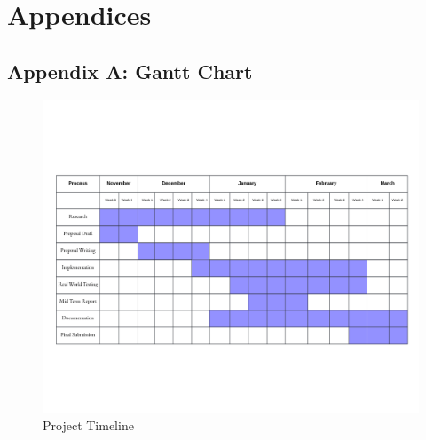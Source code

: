 \chapter{Appendices}


\section*{Appendix A: Gantt Chart}\vspace{-6em}
\begin{figure}[h!]
    \setlength{\abovecaptionskip}{-4em} 
    \includegraphics[width=\textwidth]{content/images/ganttChart.png}
    \caption{Project Timeline}
    \label{fig:gantt-chart}
\end{figure}
\newpage



